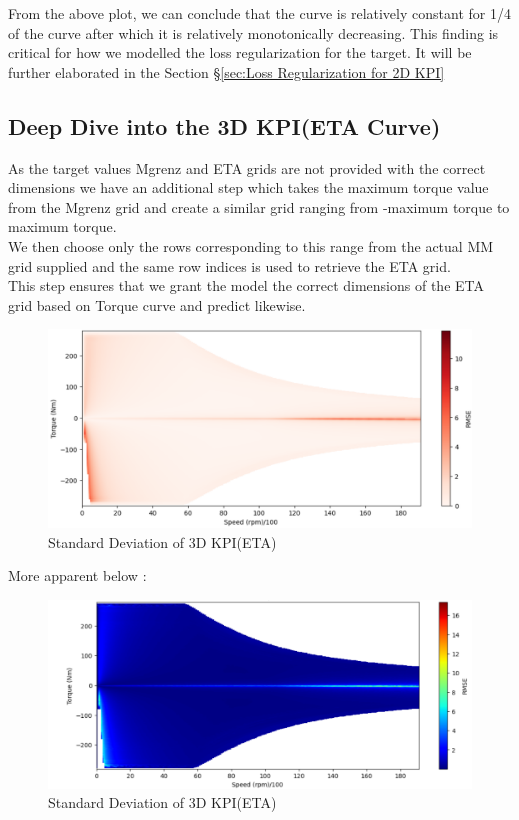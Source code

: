 \documentclass{report} %
\begin{document}
From the above plot, we can conclude that the curve is relatively constant for 1/4 of the curve after which it is relatively monotonically decreasing.
This finding is critical for how we modelled the loss regularization for the target. It will be further elaborated in the Section \S\ref{sec:Loss Regularization for 2D KPI}


\subsection{Deep Dive into the \ac{3D} KPI(ETA Curve)}\label{sec:Deep Dive into 3D KPI}
As the target values Mgrenz and ETA grids are not provided with the correct dimensions we have an additional step which takes the maximum torque value from the Mgrenz grid and create a similar grid ranging from -maximum torque to maximum torque. \\
We then choose only the rows corresponding to this range from the actual MM grid supplied and the same row indices is used to retrieve the ETA grid. \\
This step ensures that we grant the model the correct dimensions of the ETA grid based on Torque curve and predict likewise.\\


\begin{figure}[H]
    \centering
    \includegraphics[width=1\textwidth]{./ReportImages/stddev_y2.png} 
    \caption{Standard Deviation of 3D KPI(ETA)} 
    \label{fig:Standard Deviation of 3D KPI(ETA)}
\end{figure}

More apparent below :

\begin{figure}[H]
    \centering
    \includegraphics[width=1\textwidth]{./ReportImages/colorful_stddev_y2.png} 
    \caption{Standard Deviation of 3D KPI(ETA)} 
    \label{fig:Standard Deviation of 3D KPI(ETA)}
\end{figure}
\end{document}
